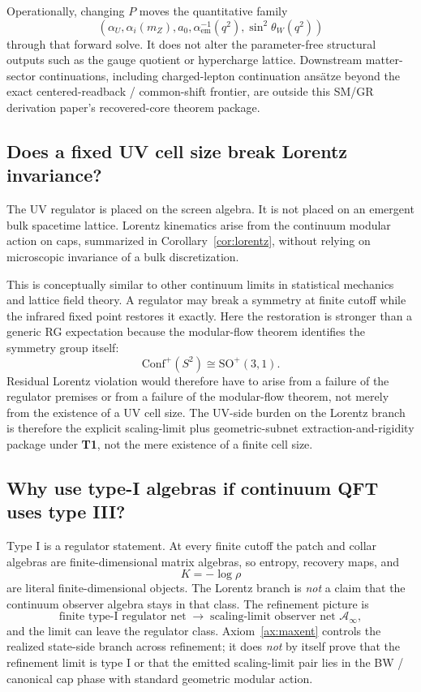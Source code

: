 \documentclass[11pt]{article}
\newcommand{\Conf}{\mathrm{Conf}}
\begin{document}
Operationally, changing \(P\) moves the quantitative family
\[
(\alpha_U,\alpha_i(m_Z),a_0,\alpha_{\mathrm{em}}^{-1}(q^2),\sin^2\theta_W(q^2))
\]
through that forward solve. It does not alter the parameter-free structural outputs such as the
gauge quotient or hypercharge lattice. Downstream matter-sector continuations, including
charged-lepton continuation ans\"atze beyond the exact centered-readback / common-shift frontier,
are outside this SM/GR derivation paper's recovered-core theorem package.

\subsection{Does a fixed UV cell size break Lorentz invariance?}

The UV regulator is placed on the screen algebra. It is not placed on an emergent bulk spacetime lattice. Lorentz kinematics arise from the continuum modular action on caps, summarized in Corollary~\ref{cor:lorentz}, without relying on microscopic invariance of a bulk discretization.

This is conceptually similar to other continuum limits in statistical mechanics and lattice field theory. A regulator may break a symmetry at finite cutoff while the infrared fixed point restores it exactly. Here the restoration is stronger than a generic RG expectation because the modular-flow theorem identifies the symmetry group itself:
\[
\Conf^+(S^2)\cong \mathrm{SO}^+(3,1).
\]
Residual Lorentz violation would therefore have to arise from a failure of the regulator premises or from a failure of the modular-flow theorem, not merely from the existence of a UV cell size.
The UV-side burden on the Lorentz branch is therefore the explicit scaling-limit plus geometric-subnet extraction-and-rigidity package under \textbf{T1}, not the mere existence of a finite cell size.

\subsection{Why use type-I algebras if continuum QFT uses type III?}

Type I is a regulator statement. At every finite cutoff the patch and collar algebras are finite-dimensional matrix algebras, so entropy, recovery maps, and
\[
K=-\log\rho
\]
are literal finite-dimensional objects. The Lorentz branch is \emph{not} a claim that the continuum observer algebra stays in that class. The refinement picture is
\[
\text{finite type-I regulator net}
\;\longrightarrow\;
\text{scaling-limit observer net } \mathcal A_\infty,
\]
and the limit can leave the regulator class. Axiom~\ref{ax:maxent} controls the realized state-side branch across refinement; it does \emph{not} by itself prove that the refinement limit is type I or that the emitted scaling-limit pair lies in the BW / canonical cap phase with standard geometric modular action.
\end{document}
